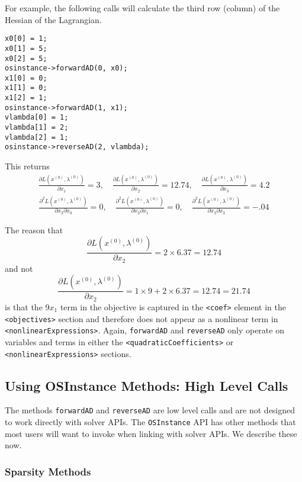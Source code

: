 \documentclass[11pt]{article}
\newcommand{\D}[2]{ \frac{\partial #1}{\partial #2} }
\newcommand{\DD}[3]{ \frac{\partial^2 #1}{\partial #2 \partial #3} }
\renewcommand{\_}{{\char"5F}}
\renewcommand{\{}{{\char"7B}}
\renewcommand{\}}{{\char"7D}}
\renewcommand{\^}{{\char"0D}}
\renewcommand{\'}{{\char"0D}}
\begin{document}
For example, the  following calls will calculate the third row (column) of the Hessian of the Lagrangian.
\begin{verbatim}
x0[0] = 1;
x0[1] = 5; 	
x0[2] = 5; 
osinstance->forwardAD(0, x0);	 
x1[0] = 0;
x1[1] = 0;
x1[2] = 1;
osinstance->forwardAD(1, x1);
vlambda[0] = 1;
vlambda[1] = 2;
vlambda[2] = 1;
osinstance->reverseAD(2, vlambda);
\end{verbatim}
This returns
\begin{eqnarray*}
\D{L (x^{(0)}, \lambda^{(0)})}{x_{1}} = 3, \quad  \D{L (x^{(0)}, \lambda^{(0)})}{x_{2}} = 12.74, \quad  \D{L (x^{(0)}, \lambda^{(0)})}{x_{3}} = 4.2
\end{eqnarray*}
\begin{eqnarray*}
\DD{L(x^{(0)}, \lambda^{(0)})}{x_{3}}{x_{0}} =0, \quad  \DD{L(x^{(0)}, \lambda^{(0)})}{x_{3}}{x_{1}} = 0, \quad   \DD{L(x^{(0)}, \lambda^{(0)})}{x_{3}}{x_{3}} =  -.04
\end{eqnarray*}

The reason that 
$$
\D{L (x^{(0)}, \lambda^{(0)})}{x_{2}} = 2 \times 6.37 = 12.74 
$$
and not
$$
\D{L (x^{(0)}, \lambda^{(0)})}{x_{2}} = 1 \times  9 + 2 \times 6.37 = 12.74  = 21.74
$$
is that the $9x_{1}$ term in the objective is captured in the {\tt <coef>} element in the {\tt <objectives>} section and therefore does not appear as a nonlinear term in {\tt  <nonlinearExpressions>}. Again, {\tt forwardAD} and {\tt reverseAD} only operate on variables and terms in either the {\tt <quadraticCoefficients>} or {\tt <nonlinearExpressions>} sections.

\subsection{Using OSInstance Methods: High Level Calls}

The methods {\tt forwardAD} and {\tt reverseAD} are low level calls and are not designed to work directly with solver APIs. The {\tt OSInstance} API has other methods that most users will want to invoke when linking with solver APIs.  We describe these now.


\subsubsection{Sparsity Methods}
\end{document}
